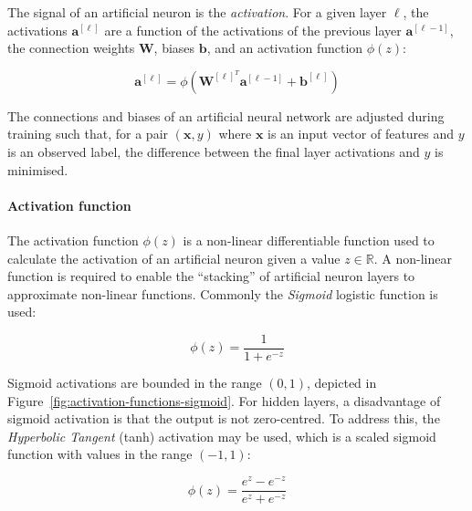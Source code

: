 The signal of an artificial neuron is the \emph{activation}. For a given layer $\ell$, the activations $\bm{a}^{[\ell]}$ are a function of the activations of the previous layer $\bm{a}^{[\ell - 1]}$, the connection weights $\bm{W}$, biases $\bm{b}$, and an activation function $\phi(z)$:

\begin{equation}
  \bm{a}^{[\ell]} = \phi \left( \bm{W}^{[\ell]^T} \bm{a}^{[\ell-1]} + \bm{b}^{[\ell]} \right)
\end{equation}

The connections and biases of an artificial neural network are adjusted during training such that, for a pair $(\bm{x}, y)$ where $\bm{x}$ is an input vector of features and $y$ is an observed label, the difference between the final layer activations and $y$ is minimised.


\paragraph*{Activation function}

The activation function $\phi(z)$ is a non-linear differentiable function used to calculate the activation of an artificial neuron given a value $z \in \mathbb{R}$. A non-linear function is required to enable the ``stacking'' of artificial neuron layers to approximate non-linear functions. Commonly the \emph{Sigmoid} logistic function is used:

\begin{equation}
  \phi(z) = \frac{1}{1 + e^{-z}}
\end{equation}

Sigmoid activations are bounded in the range $(0,1)$, depicted in Figure~\ref{fig:activation-functions-sigmoid}.
For hidden layers, a disadvantage of sigmoid activation is that the output is not zero-centred. To address this, the \emph{Hyperbolic Tangent} (tanh) activation may be used, which is a scaled sigmoid function with values in the range $(-1,1)$:

\begin{equation}
  \phi(z) = \frac{e^{z} - e^{-z}}{e^z + e^{-z}}
\end{equation}

